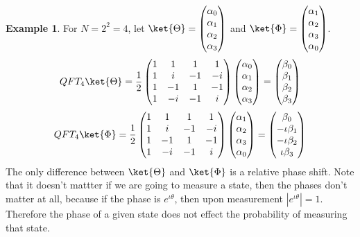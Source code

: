 \documentclass[12pt, oneside]{book}
\theoremstyle{definition}
\theoremstyle{definition}
\newtheorem{example}{Example}[section]
\theoremstyle{remark}
\begin{document}
\begin{itemize}
    \begin{example}
        For $N=2^2=4$, let $\ket{\Theta}=\begin{pmatrix} \alpha_0 \\ \alpha_1 \\ \alpha_2 \\ \alpha_3 \end{pmatrix}$ and $\ket{\Phi}=\begin{pmatrix} \alpha_1 \\ \alpha_2 \\ \alpha_3 \\ \alpha_0 \end{pmatrix}$. 
        \[
        QFT_4\ket{\Theta}= \dfrac{1}{2}\begin{pmatrix} 1 & 1 & 1 & 1 \\ 1 & i & -1 & -i \\ 1 & -1 & 1 & -1 \\ 1 & -i & -1 & i \end{pmatrix}\begin{pmatrix} \alpha_0 \\ \alpha_1 \\ \alpha_2 \\ \alpha_3 \end{pmatrix}=\begin{pmatrix} \beta_0 \\ \beta_1 \\ \beta_2 \\ \beta_3 \end{pmatrix}
        \]
        \[
        QFT_4\ket{\Phi}= \dfrac{1}{2}\begin{pmatrix} 1 & 1 & 1 & 1 \\ 1 & i & -1 & -i \\ 1 & -1 & 1 & -1 \\ 1 & -i & -1 & i \end{pmatrix}\begin{pmatrix} \alpha_1 \\ \alpha_2 \\ \alpha_3 \\ \alpha_0 \end{pmatrix}=\begin{pmatrix} \beta_0 \\ -\iota \beta_1 \\ -\iota \beta_2 \\ \iota \beta_3 \end{pmatrix}
        \]
        The only difference between $\ket{\Theta}$ and $\ket{\Phi}$ is a relative phase shift. 
        Note that it doesn't mattter if we are going to measure a state, then the phases don't matter at all, because if the phase is $e^{\iota \theta}$, then upon measurement $|e^{\iota \theta}|=1$. Therefore the phase of a given state does not effect the probability of measuring that state.

\end{example}
\end{itemize}
\end{document}

